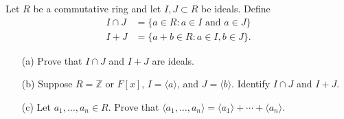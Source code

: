   \begin{exercise}[Shifrin 4.1.17]
    Let $R$ be a commutative ring and let $I,J \subset R$ be ideals. Define
    \begin{align*}
      I \cap J &= \{a \in R : a \in I \text{ and } a \in J\}\\
      I + J &= \{a + b \in R : a \in I, b \in J\}.
    \end{align*}
    \begin{enumerate}
      \item[(a)] Prove that $I \cap J$ and $I + J$ are ideals.
      \item[(b)] Suppose $R = \mathbb{Z}$ or $F[x]$, $I = \langle a \rangle$, and $J = \langle b \rangle$. Identify $I \cap J$ and $I + J$.
      \item[(c)] Let $a_1,\ldots,a_n \in R$. Prove that $\langle a_1,\ldots,a_n \rangle = \langle a_1 \rangle + \cdots + \langle a_n \rangle$.
    \end{enumerate}
  \end{exercise}
